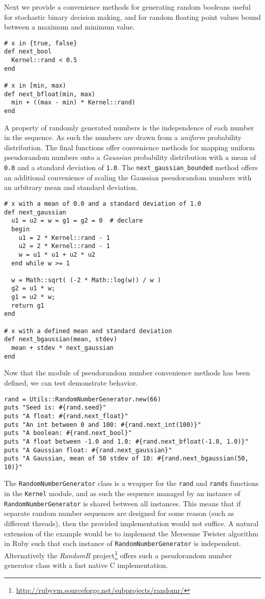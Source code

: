 Next we provide a convenience methods for generating random booleans useful for stochastic binary decision making, and for random floating point values bound between a maximum and minimum value. 

\begin{lstlisting}
# x in {true, false}
def next_bool
  Kernel::rand < 0.5
end

# x in [min, max)
def next_bfloat(min, max)
  min + ((max - min) * Kernel::rand)
end
\end{lstlisting}

A property of randomly generated numbers is the independence of each number in the sequence. As such the numbers are drawn from a \emph{uniform} probability distribution. The final functions offer convenience methods for mapping uniform pseudorandom numbers onto a \emph{Gaussian} probability distribution with a mean of \texttt{0.0} and a standard deviation of \texttt{1.0}. The \texttt{next\_gaussian\_bounded} method offers an additional convenience of scaling the Gaussian pseudorandom numbers with an arbitrary mean and standard deviation.

\begin{lstlisting}
# x with a mean of 0.0 and a standard deviation of 1.0
def next_gaussian
  u1 = u2 = w = g1 = g2 = 0  # declare
  begin
    u1 = 2 * Kernel::rand - 1
    u2 = 2 * Kernel::rand - 1
    w = u1 * u1 + u2 * u2
  end while w >= 1

  w = Math::sqrt( (-2 * Math::log(w)) / w )
  g2 = u1 * w;
  g1 = u2 * w;
  return g1
end

# x with a defined mean and standard deviation
def next_bgaussian(mean, stdev)
  mean + stdev * next_gaussian
end
\end{lstlisting}

Now that the module of pseudorandom number convenience methods has been defined, we can test demonstrate behavior. 

\begin{lstlisting}
rand = Utils::RandomNumberGenerator.new(66)
puts "Seed is: #{rand.seed}"
puts "A float: #{rand.next_float}"
puts "An int between 0 and 100: #{rand.next_int(100)}"
puts "A boolean: #{rand.next_bool}"
puts "A float between -1.0 and 1.0: #{rand.next_bfloat(-1.0, 1.0)}"
puts "A Gaussian float: #{rand.next_gaussian}"
puts "A Gaussian, mean of 50 stdev of 10: #{rand.next_bgaussian(50, 10)}"
\end{lstlisting}

The \texttt{RandomNumberGenerator} class is a wrapper for the \texttt{rand} and \texttt{rands} functions in the \texttt{Kernel} module, and as such the sequence managed by an instance of \texttt{RandomNumberGenerator} is shared between all instances. This means that if separate random number sequences are designed for some reason (such as different threads), then the provided implementation would not suffice. A natural extension of the example would be to implement the Mersenne Twister algorithm in Ruby such that each instance of \texttt{RandomNumberGenerator} is independent. Alternatively the \emph{RandomR} project\footnote{\url{http://rubyvm.sourceforge.net/subprojects/randomr/}} offers such a pseudorandom number generator class with a fast native C implementation.
